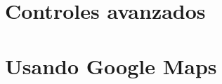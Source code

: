 \documentclass[letterpaper,12pt,dvips]{book}
\newcounter{ejemplo}
\begin{document}
\begin{mainmatter}
\chapter{Controles avanzados}\label{cap:ascendente}

%

\chapter{Usando Google Maps}


%




\end{mainmatter}

\begin{backmatter}

\printindex
\end{backmatter}
\end{document}
